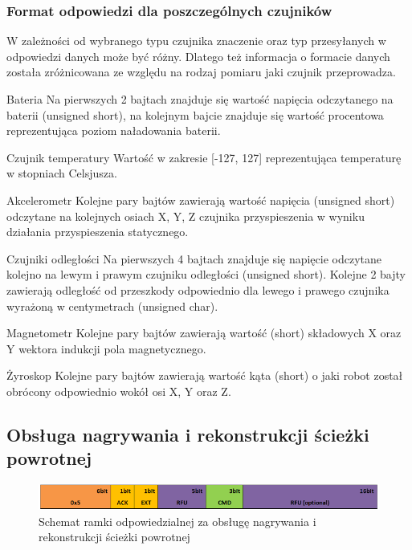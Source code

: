 \subsubsection{Format odpowiedzi dla poszczególnych czujników}
W zależności od wybranego typu czujnika znaczenie oraz typ przesyłanych w
odpowiedzi danych może być różny. Dlatego też informacja o formacie danych
została zróżnicowana ze względu na rodzaj pomiaru jaki czujnik przeprowadza. 
\begin{basedescript}{\desclabelstyle{\pushlabel}\desclabelwidth{25mm}}
\setlength{\parsep}{0pt}
\setlength{\itemsep}{0mm}
\setlength{\parskip}{0pt}
\item[Bateria]
	Na pierwszych 2 bajtach znajduje się wartość napięcia odczytanego na baterii
	(unsigned short), na kolejnym bajcie znajduje się wartość procentowa
	reprezentująca poziom naładowania baterii. 
\item[Czujnik temperatury]
	Wartość w zakresie [-127, 127] reprezentująca temperaturę w
	stopniach Celsjusza.
\item[Akcelerometr] 
	Kolejne pary bajtów zawierają wartość napięcia (unsigned short) odczytane na
	kolejnych osiach X, Y, Z czujnika przyspieszenia w wyniku działania przyspieszenia statycznego. 
\item[Czujniki odległości] 
	Na pierwszych 4 bajtach znajduje się napięcie odczytane kolejno na lewym i
	prawym czujniku odległości (unsigned short). Kolejne 2 bajty zawierają
	odległość od przeszkody odpowiednio dla lewego i prawego czujnika wyrażoną w
	centymetrach (unsigned char).
\item[Magnetometr]
	Kolejne pary bajtów zawierają wartość (short) składowych X oraz Y wektora
	indukcji pola magnetycznego. 
\item[Żyroskop]
	Kolejne pary bajtów zawierają wartość kąta (short) o jaki robot został
	obrócony odpowiednio wokół osi X, Y oraz Z. 
\end{basedescript}
\newpage
\subsection{Obsługa nagrywania i rekonstrukcji ścieżki powrotnej}
\begin{figure}[h!]
 \centering
 \includegraphics[width=\textwidth]{../images/appendix/cmd_0x05.png}
 \caption{Schemat ramki odpowiedzialnej za obsługę nagrywania i rekonstrukcji ścieżki powrotnej}
 \label{fig:CMD_0x05}
\end{figure}

